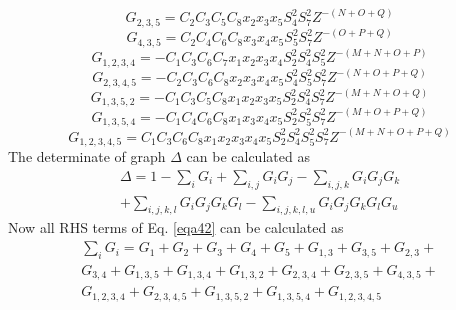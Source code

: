\documentclass{osa-article}
\begin{document}
 \begin{equation}
G_{2,3,5}=C_2C_3C_5C_8x_2x_3x_5{S^2_4}{S^2_7}Z^{-(N+O+Q)}
\label{eqa35}
\end{equation}
 \begin{equation}
G_{4,3,5}=C_2C_4C_6C_8x_3x_4x_5{S^2_5}{S^2_7}Z^{-(O+P+Q)}
\label{eqa36}
\end{equation}
 \begin{equation}
G_{1,2,3,4}=-C_1C_3C_6C_7x_1x_2x_3x_4{S^2_2}{S^2_4}{S^2_5}Z^{-(M+N+O+P)}
\label{eqa37}
\end{equation}
 \begin{equation}
G_{2,3,4,5}=-C_2C_3C_6C_8x_2x_3x_4x_5{S^2_4}{S^2_5}{S^2_7}Z^{-(N+O+P+Q)}
\label{eqa38}
\end{equation}
 \begin{equation}
G_{1,3,5,2}=-C_1C_3C_5C_8x_1x_2x_3x_5{S^2_2}{S^2_4}{S^2_7}Z^{-(M+N+O+Q)}
\label{eqa39}
\end{equation}
 \begin{equation}
G_{1,3,5,4}=-C_1C_4C_6C_8x_1x_3x_4x_5{S^2_2}{S^2_5}{S^2_7}Z^{-(M+O+P+Q)}
\label{eqa40}
\end{equation}
 \begin{equation}
G_{1,2,3,4,5}=C_1C_3C_6C_8x_1x_2x_3x_4x_5{S^2_2}{S^2_4}{S^2_5}{S^2_7}Z^{-(M+N+O+P+Q)}
\label{eqa41}
\end{equation}
The determinate of graph \textit {$\Delta$} can be calculated as\\
\begin{equation}
\begin{split}
\Delta=
1-\sum_{i} {G_i}+\sum_{i,j} {G_i G_j}-\sum_{i,j,k} {G_i G_j G_k}\\+\sum_{i,j,k,l} {G_i G_j G_kG_l}-\sum_{i,j,k,l,u} {G_i G_j G_kG_lG_u} 
\label{eqa42}
\end{split}
\end{equation}
Now all RHS terms of Eq. \ref{eqa42} can be calculated as\\
\begin{equation}
\begin{split}
\sum_{i} {G_i}=G_1+G_2+G_3+G_4+G_5+G_{1,3}+G_{3,5}+G_{2,3}+\\G_{3,4}+G_{1,3,5}+G_{1,3,4}+G_{1,3,2}+G_{2,3,4}+G_{2,3,5}+G_{4,3,5}+\\G_{1,2,3,4}+G_{2,3,4,5}+G_{1,3,5,2}+G_{1,3,5,4}+G_{1,2,3,4,5} 
\label{eqa43}
\end{split}
\end{equation}
\end{document}
